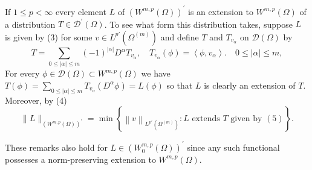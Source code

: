 \begin{para}
  If $1 \leq p<\infty$ every element $L$ of $\left(W^{m,p}(\Omega)\right)^{\prime}$ is an 
  extension to $W^{m,p}(\Omega)$ of a distribution $T \in \mathscr{D}^{\prime}(\Omega)$. To see what form this distribution takes, suppose $L$ is given by (3) for some $v \in L^{p'}(\Omega^{(m)})$ and define $T$ and $T_{v_\alpha}$ on $\mathscr{D}(\Omega)$ by
  \begin{equation}\label{eq:3.5}
    T=\sum_{0 \leq|\alpha| \leq m}(-1)^{|\alpha|} D^\alpha T_{v_\alpha}, \quad T_{v_\alpha}(\phi)=\left\langle\phi, v_\alpha\right\rangle . \quad 0 \leq|\alpha| \leq m,
  \end{equation}
  For every $\phi \in \mathscr{D}(\Omega) \subset W^{m,p}(\Omega)$ we have $T(\phi)=\sum_{0 \leq|\alpha| \leq m} T_{v_\alpha}\left(D^\alpha \phi\right)=L(\phi)$ so that $L$ is clearly an extension of $T$. Moreover, by (4)
  \[
  \|L\|_{\left(W^{m,p}(\Omega)\right)^{\prime}}=\min \left\{\left\|v\right\|_{L^{p'}(\Omega^{(m)})}: L \text { extends } T \text { given by }(5)\right\} .
  \]
\end{para}

These remarks also hold for $L \in\left(W_0^{m, p}(\Omega)\right)^{\prime}$ since any such functional possesses a norm-preserving extension to $W^{m,p}(\Omega)$.

